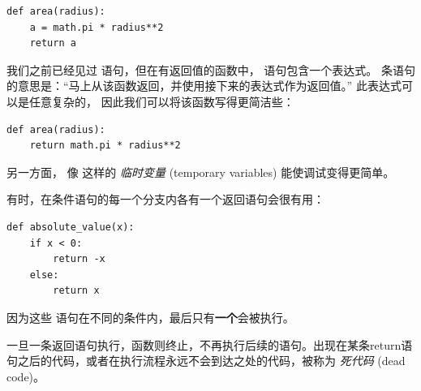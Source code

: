 \begin{lstlisting}
def area(radius):
    a = math.pi * radius**2
    return a
\end{lstlisting}

%

我们之前已经见过  语句，但在有返回值的函数中，  语句包含一个表达式。
条语句的意思是：``马上从该函数返回，并使用接下来的表达式作为返回值。''
此表达式可以是任意复杂的， 因此我们可以将该函数写得更简洁些：
  

\begin{lstlisting}
def area(radius):
    return math.pi * radius**2
\end{lstlisting}

%

另一方面， 像  这样的 {\em 临时变量} (temporary variables) 能使调试变得更简单。

  


有时，在条件语句的每一个分支内各有一个返回语句会很有用：

\begin{lstlisting}
def absolute_value(x):
    if x < 0:
        return -x
    else:
        return x
\end{lstlisting}

%

因为这些  语句在不同的条件内，最后只有{\bf 一个}会被执行。


一旦一条返回语句执行，函数则终止，不再执行后续的语句。出现在某条return语句之后的代码，或者在执行流程永远不会到达之处的代码，被称为 {\em 死代码} (dead code)。
  


